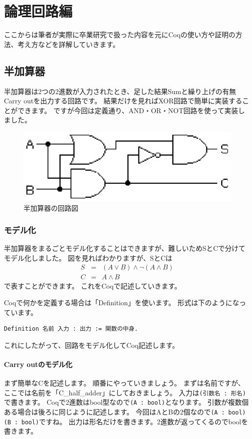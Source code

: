 \documentclass{jsbook}
\begin{document}
\chapter{論理回路編}
ここからは筆者が実際に卒業研究で扱った内容を元にCoqの使い方や証明の方法、考え方などを詳解していきます。
\newpage
\section{半加算器}
半加算器は2つの2進数が入力されたとき、足した結果Sumと繰り上げの有無Carry outを出力する回路です。
結果だけを見ればXOR回路で簡単に実装することができます。
ですが今回は定義通り、AND・OR・NOT回路を使って実装しました。

\begin{figure}[htbp]
\begin{center}
  \includegraphics[scale=1.0]{image/Half_adder.eps}
  \caption{半加算器の回路図 \protect \footnotemark}
\end{center}
\end{figure}


\subsection*{モデル化}
半加算器をまるごとモデル化することはできますが、難しいためSとCで分けてモデル化しました。
図を見ればわかりますが、SとCは
\begin{eqnarray}
S&=&(A \vee B) \wedge \lnot (A \wedge B) \nonumber \\
C&=&A \wedge B \nonumber
\end{eqnarray}
で表すことができます。
これをCoqで記述していきます。

Coqで何かを定義する場合は「Definition」を使います。
形式は下のようになっています。
\begin{verbatim}
Definition 名前 入力 : 出力 := 関数の中身.
\end{verbatim}
これにしたがって、回路をモデル化してCoq記述します。

\subsubsection*{Carry outのモデル化}
まず簡単なCを記述します。
順番にやっていきましょう。
まずは名前ですが、ここでは名前を「C\_half\_adder」にしておきましょう。
入力は\verb|(引数名 : 形名)|で書きます。
Coqで2進数はbool型なので\verb|(A : bool)|となります。
引数が複数個ある場合は後ろに同じように記述します。
今回はAとBの2個なので\verb|(A : bool) (B : bool)|ですね。
出力は形名だけを書きます。2進数が返ってくるのでboolを書きます。
\end{document}
